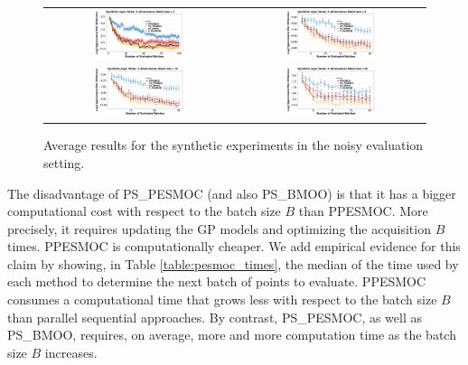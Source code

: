 \begin{figure}[ht]
\begin{center}
\begin{tabular}{cc}
\includegraphics[width=0.49\textwidth]{Figures/ppesmoc/4D4B_noise.pdf} & 
\includegraphics[width=0.49\textwidth]{Figures/ppesmoc/4D8B_noise.pdf} \\
\includegraphics[width=0.49\textwidth]{Figures/ppesmoc/4D10B_noise.pdf} &
\includegraphics[width=0.49\textwidth]{Figures/ppesmoc/4D20B_noise.pdf}
\end{tabular}
\caption{Average results for the synthetic experiments in the noisy evaluation setting.}
\label{fig:ppesmoc_synthetic_noisy}
\end{center}
\end{figure}

The disadvantage of PS\_PESMOC (and also PS\_BMOO) is that it has a bigger computational cost with 
respect to the batch size $B$ than PPESMOC. More precisely, it requires updating the GP models 
and optimizing the acquisition $B$ times. PPESMOC is computationally cheaper. We add 
empirical evidence for this claim by showing, in Table \ref{table:pesmoc_times}, the median of 
the time used by each method to determine the next batch of points to evaluate. 
PPESMOC consumes a computational time that grows less with respect to the batch size $B$ than parallel sequential approaches.  By contrast, 
PS\_PESMOC, as well as PS\_BMOO, requires, on average, more and more computation time as the batch size $B$ increases.

